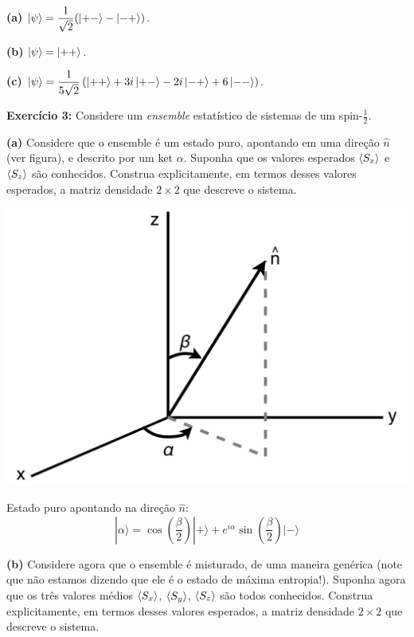 \documentclass[12pt]{article}
\begin{document}
\textbf{(a)} $\displaystyle\ket{\psi} = \frac{1}{\sqrt{2}}(\ket{+-}-\ket{-+})$.

\textbf{(b)} $\ket{\psi} = \ket{++}$.

\textbf{(c)} $\displaystyle\ket{\psi} = \frac{1}{5\sqrt{2}}
\left(\ket{++} + 3i\ket{+-} - 2i\ket{-+} + 6\ket{--}\right)$.

\clearpage

\textbf{Exercício 3:} Considere um \emph{ensemble} estatístico de sistemas de um spin-$\frac{1}{2}$.

\textbf{(a)} Considere que o ensemble é um estado puro, apontando em uma direção $\hat{n}$ (ver figura), e descrito por um ket $\alpha$. Suponha que os valores esperados $\ev{S_x}$ e $\ev{S_z}$ são conhecidos. 
Construa explicitamente, em termos desses valores esperados, a matriz densidade $2\times2$ que descreve o sistema.

\medskip

\begin{minipage}{0.35\textwidth}
\includegraphics[width=\textwidth]{Figures/nVersor.pdf}
\end{minipage}%
\begin{minipage}{0.65\textwidth}
Estado puro apontando na direção $\hat{n}$:
\[
|\alpha\rangle=\cos \left(\frac{\beta}{2}\right)|+\rangle+e^{i \alpha} \sin \left(\frac{\beta}{2}\right)|-\rangle
\]
\end{minipage}

\medskip

\textbf{(b)} Considere agora que o ensemble é misturado, de uma maneira genérica 
(note que não estamos dizendo que ele é o estado de máxima entropia!). 
Suponha agora que os três valores médios
$\ev{S_x}$, $\ev{S_y}$, $\ev{S_z}$ são todos conhecidos.
Construa explicitamente, em termos desses valores esperados, a matriz densidade $2\times2$ que descreve o sistema.
\end{document}
